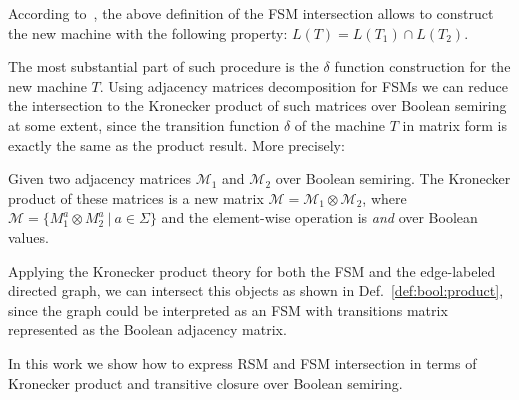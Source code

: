 According to~\cite{automata:theory:10.5555/1177300}, the above definition
of the FSM intersection allows to construct the new machine with
the following property: $L(T) = L(T_1) \cap L(T_2)$.

The most substantial part of such procedure is the $\delta$ function construction
for the new machine $T$. Using adjacency matrices decomposition for FSMs we can
reduce the intersection to the Kronecker product of such matrices over Boolean
semiring at some extent, since the transition function $\delta$ of the machine
$T$ in matrix form is exactly the same as the product result. More precisely:

\begin{definition}
\label{def:bool:product}
Given two adjacency matrices $\mathcal{M}_1$ and $\mathcal{M}_2$ over Boolean semiring.
The Kronecker product of these matrices is a new matrix
$\mathcal{M} = \mathcal{M}_1 \otimes \mathcal{M}_2$, where $\mathcal{M} = \{ M_1^a \otimes M_2^a~|~a \in \Sigma \}$ and the element-wise operation is \textit{and} over Boolean values.

\end{definition}

Applying the Kronecker product theory for both the FSM and the edge-labeled directed graph,
we can intersect this objects as shown in Def.~\ref{def:bool:product}, since the
graph could be interpreted as an FSM with transitions matrix represented as
the Boolean adjacency matrix.

In this work we show how to express RSM and FSM intersection in terms of
Kronecker product and transitive closure over Boolean semiring.